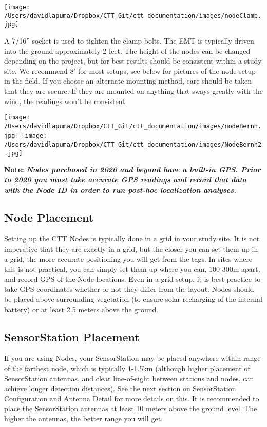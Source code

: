 \documentclass[
]{article}
\begin{document}
\texttt{[image: /Users/davidlapuma/Dropbox/CTT\_Git/ctt\_documentation/images/nodeClamp.jpg]}

A 7/16'' socket is used to tighten the clamp bolts. The EMT is typically
driven into the ground approximately 2 feet. The height of the nodes can
be changed depending on the project, but for best results should be
consistent within a study site. We recommend 8' for most setups, see
below for pictures of the node setup in the field. If you choose an
alternate mounting method, care should be taken that they are secure. If
they are mounted on anything that sways greatly with the wind, the
readings won't be consistent.

\texttt{[image: /Users/davidlapuma/Dropbox/CTT\_Git/ctt\_documentation/images/nodeBernh.jpg]}
\texttt{[image: /Users/davidlapuma/Dropbox/CTT\_Git/ctt\_documentation/images/NodeBernh2.jpg]}

\textbf{Note:} \textbf{\emph{Nodes purchased in 2020 and beyond have a
built-in GPS. Prior to 2020 you must take accurate GPS readings and
record that data with the Node ID in order to run post-hoc localization
analyses.}}

\hypertarget{node-placement}{%
\subsection{Node Placement}\label{node-placement}}

Setting up the CTT Nodes is typically done in a grid in your study site.
It is not imperative that they are exactly in a grid, but the closer you
can set them up in a grid, the more accurate positioning you will get
from the tags. In sites where this is not practical, you can simply set
them up where you can, 100-300m apart, and record GPS of the Node
locations. Even in a grid setup, it is best practice to take GPS
coordinates whether or not they differ from the layout. Nodes should be
placed above surrounding vegetation (to ensure solar recharging of the
internal battery) or at least 2.5 meters above the ground.

\hypertarget{sensorstation-placement}{%
\subsection{SensorStation Placement}\label{sensorstation-placement}}

If you are using Nodes, your SensorStation may be placed anywhere within
range of the farthest node, which is typically 1-1.5km (although higher
placement of SensorStation antennas, and clear line-of-sight between
stations and nodes, can achieve longer detection distances). See the
next section on SensorStation Configuration and Antenna Detail for more
details on this. It is recommended to place the SensorStation antennas
at least 10 meters above the ground level. The higher the antennas, the
better range you will get.
\end{document}
